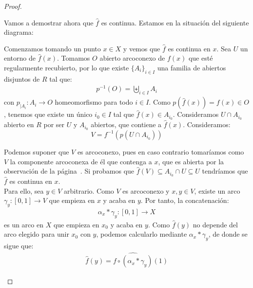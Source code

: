 \begin{teo}
\begin{proof}
\begin{description}
            Vamos a demostrar ahora que $\hat{f}$ es continua. Estamos en la situación del siguiente diagrama:
            \begin{center}
            \end{center}
            
            Comenzamos tomando un punto $x\in X$ y vemos que $\hat{f}$ es continua en $x$. Sea $U$ un entorno de $\hat{f}(x)$. Tomamos $O$ abierto arcoconexo de $f(x)$ que esté regularmente recubierto, por lo que existe $\{A_i\}_{i\in I}$ una familia de abiertos disjuntos de $R$ tal que:
            \begin{gather*}
                p^{-1}(O) = \biguplus\limits_{i\in I} A_i 
            \end{gather*}
            con $p_{|A_i}:A_i\to O$ homeomorfismo para todo $i\in I$.
            Como $p(\hat{f}(x)) = f(x) \in O$, tenemos que existe un único $i_0\in I$ tal que $\hat{f}(x)\in A_{i_0}$. Consideramos $U\cap A_{i_0}$ abierto en $R$ por ser $U$ y $A_{i_0}$ abiertos, que contiene a $\hat{f}(x)$. Consideramos:
            \begin{equation*}
                V = f^{-1}\left(p(U\cap A_{i_0})\right)
            \end{equation*}

            Podemos suponer que $V$ es arcoconexo, pues en caso contrario tomaríamos como $V$ la componente arcoconexa de él que contenga a $x$, que es abierta por la observación de la página~\pageref{obs:componentes_arcoconexas_abiertas}. Si probamos que $\hat{f}(V)\subseteq A_{i_0}\cap U \subseteq U$ tendríamos que $\hat{f}$ es continua en $x$.\\

            Para ello, sea $y\in V$ arbitrario. Como $V$ es arcoconexo y $x,y\in V$, existe un arco $\gamma_y : [0,1] \to V$ que empieza en $x$ y acaba en $y$. Por tanto, la concatenación:
            \begin{gather*}
                \alpha_x \ast \gamma_y : [0,1] \to X
            \end{gather*}
            es un arco en $X$ que empieza en $x_0$ y acaba en $y$. Como $\hat{f}(y)$ no depende del arco elegido para unir $x_0$ con $y$, podemos calcularlo mediante $\alpha_x \ast \gamma_y$, de donde se sigue que:
            \begin{gather*}
                \hat{f}(y) = \widehat{f \circ (\alpha_x \ast \gamma_y)}(1)
            \end{gather*}


\end{description}
\end{proof}
\end{teo}

